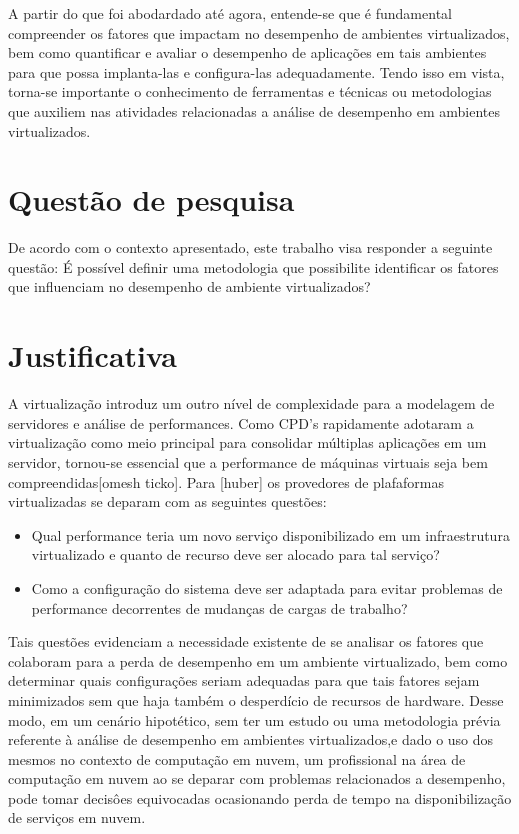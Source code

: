 A partir do que foi abodardado até agora, entende-se que é fundamental compreender os fatores que impactam no desempenho de ambientes virtualizados, bem como quantificar e avaliar o desempenho de aplicações em tais ambientes para que possa implanta-las e configura-las adequadamente. Tendo isso em vista, torna-se importante o conhecimento de ferramentas e técnicas ou metodologias que auxiliem nas atividades relacionadas a análise de desempenho em ambientes virtualizados. 

\section{Quest\~ao de pesquisa}
De acordo com o contexto apresentado, este trabalho visa responder a seguinte questão: É possível definir uma metodologia que possibilite identificar os fatores que influenciam no desempenho de ambiente virtualizados? 

\section{Justificativa}
A virtualização introduz um outro nível de complexidade para a modelagem de servidores e análise de performances. Como CPD's rapidamente adotaram a virtualização como meio principal para consolidar múltiplas aplicações em um servidor, tornou-se essencial que a performance de máquinas virtuais seja bem compreendidas[omesh ticko]. Para [huber] os provedores de plafaformas virtualizadas se deparam com as seguintes questões:

\begin{itemize}
  \item Qual performance teria um novo serviço disponibilizado em um infraestrutura virtualizado e quanto de recurso deve ser alocado para tal serviço?

  \item Como a configuração do sistema deve ser adaptada para evitar problemas de performance decorrentes de mudanças de cargas de trabalho?
\end{itemize}


Tais questões evidenciam a necessidade existente de se analisar os fatores que colaboram para a perda de desempenho em um ambiente virtualizado, bem como determinar quais configurações seriam adequadas para que tais fatores sejam minimizados sem que haja também o desperdício de recursos de hardware. Desse modo, em um cenário hipotético, sem ter um estudo ou uma metodologia prévia referente à análise de desempenho em ambientes virtualizados,e dado o uso dos mesmos no contexto de computação em nuvem, um profissional na área de computação em nuvem ao se deparar com problemas relacionados a desempenho, pode tomar decisôes equivocadas ocasionando perda de tempo na disponibilização de serviços em nuvem.

